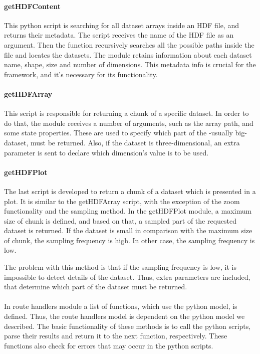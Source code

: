 \paragraph{getHDFContent}
This python script is searching for all dataset arrays inside an HDF file, and returns their metadata. The script receives the name of the HDF file as an argument. Then the function recursively searches all the possible paths inside the file and locates the datasets. The module retains information about each dataset name, shape, size and number of dimensions. This metadata info is crucial for the framework, and it's necessary for its functionality.

\paragraph{getHDFArray}
This script is responsible for returning a chunk of a specific dataset. In order to do that, the module receives a number of arguments, such as the array path, and some state properties. These are used to specify which part of the -usually big- dataset, must be returned. Also, if the dataset is three-dimensional, an extra parameter is sent to declare which dimension's value is to be used.

\paragraph{getHDFPlot}
The last script is developed to return a chunk of a dataset which is presented in a plot. It is similar to the getHDFArray script, with the exception of the zoom functionality and the sampling method. In the getHDFPlot module, a maximum size of chunk is defined, and based on that, a sampled part of the requested dataset is returned. If the dataset is small in comparison with the maximum size of chunk, the sampling frequency is high. In other case, the sampling frequency is low. \par 
	The problem with this method is that if the sampling frequency is low, it is impossible to detect details of the dataset. Thus, extra parameters are included, that determine which  part of the dataset must be returned.
	
\paragraph{}
In route handlers module a list of functions, which use the python model, is defined. Thus, the route handlers model is dependent on the python model we described. The basic functionality of these methods is to call the python scripts, parse their results and return it to the next function, respectively. These functions also check for errors that may occur in the python scripts. 


